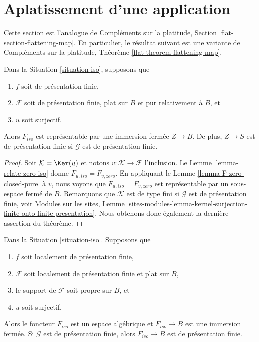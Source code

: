 \section{Aplatissement d'une application}
\label{section-flattening-map}

\noindent
Cette section est l'analogue de
Compléments sur la platitude, Section \ref{flat-section-flattening-map}.
En particulier, le résultat suivant est une variante de
Compléments sur la platitude, Théorème \ref{flat-theorem-flattening-map}.

\begin{theorem}
\label{theorem-flattening-map}
Dans la Situation \ref{situation-iso}, supposons que
\begin{enumerate}
\item $f$ soit de présentation finie,
\item $\mathcal{F}$ soit de présentation finie, plat sur $B$ et
pur relativement à $B$, et
\item $u$ soit surjectif.
\end{enumerate}
Alors $F_{iso}$ est représentable par une immersion fermée $Z \to B$.
De plus, $Z \to S$ est de présentation finie si $\mathcal{G}$ est
de présentation finie.
\end{theorem}

\begin{proof}
Soit $\mathcal{K} = \Ker(u)$ et notons $v : \mathcal{K} \to \mathcal{F}$
l'inclusion. Le Lemme \ref{lemma-relate-zero-iso} donne
$F_{u, iso} = F_{v, zero}$. En appliquant le Lemme \ref{lemma-F-zero-closed-pure}
à $v$, nous voyons que $F_{u, iso} = F_{v, zero}$ est représentable
par un sous-espace fermé de $B$. Remarquons que $\mathcal{K}$ est de type fini
si $\mathcal{G}$ est de présentation finie, voir
Modules sur les sites, Lemme
\ref{sites-modules-lemma-kernel-surjection-finite-onto-finite-presentation}.
Nous obtenons donc également la dernière assertion du théorème.
\end{proof}

\begin{lemma}
\label{lemma-F-iso-closed}
Dans la Situation \ref{situation-iso}. Supposons que
\begin{enumerate}
\item $f$ soit localement de présentation finie,
\item $\mathcal{F}$ soit localement de présentation finie et plat sur $B$,
\item le support de $\mathcal{F}$ soit propre sur $B$, et
\item $u$ soit surjectif.
\end{enumerate}
Alors le foncteur $F_{iso}$ est un espace algébrique et $F_{iso} \to B$
est une immersion fermée. Si $\mathcal{G}$ est de présentation finie, alors
$F_{iso} \to B$ est de présentation finie.
\end{lemma}

